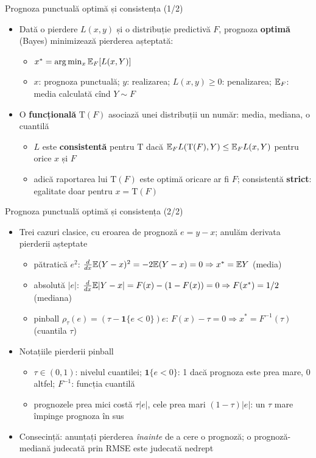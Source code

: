 \begin{frame}{Prognoza punctuală optimă și consistența (1/2)}
\itemsize{\small}
\begin{itemize}
    \item Dată o pierdere $L(x, y)$ și o distribuție predictivă $F$, prognoza \textbf{optimă} (Bayes) minimizează pierderea așteptată:
    \begin{itemize}
        \item $x^* = \arg\min_x \mathbb{E}_F[L(x, Y)]$
        \item $x$: prognoza punctuală; $y$: realizarea; $L(x, y) \ge 0$: penalizarea; $\mathbb{E}_F$: media calculată cînd $Y \sim F$
    \end{itemize}
    \item O \textbf{funcțională} $\mathrm{T}(F)$ asociază unei distribuții un număr: media, mediana, o cuantilă
    \begin{itemize}
        \item $L$ este \textbf{consistentă} pentru $\mathrm{T}$ dacă $\mathbb{E}_F L(\mathrm{T}(F), Y) \le \mathbb{E}_F L(x, Y)$ pentru orice $x$ și $F$ 
        \item adică raportarea lui $\mathrm{T}(F)$ este optimă oricare ar fi $F$; consistentă \textbf{strict}: egalitate doar pentru $x = \mathrm{T}(F)$
    \end{itemize}
\end{itemize}
\end{frame}

\begin{frame}{Prognoza punctuală optimă și consistența (2/2)}
\itemsize{\small}
\begin{itemize}
    \item Trei cazuri clasice, cu eroarea de prognoză $e = y - x$; anulăm derivata pierderii așteptate
    \begin{itemize}
        \item pătratică $e^2$: $\frac{d}{dx}\mathbb{E}(Y - x)^2 = -2\mathbb{E}(Y - x) = 0 \Rightarrow x^* = \mathbb{E} Y$ (media)
        \item absolută $|e|$: $\frac{d}{dx}\mathbb{E}|Y - x| = F(x) - (1 - F(x)) = 0 \Rightarrow F(x^*) = 1/2$ (mediana)
        \item pinball $\rho_\tau(e) = (\tau - \mathbf 1\{e < 0\})e$: $F(x) - \tau = 0 \Rightarrow x^* = F^{-1}(\tau)$ (cuantila $\tau$)
    \end{itemize}
    \item Notațiile pierderii pinball
    \begin{itemize}
        \item $\tau \in (0, 1)$: nivelul cuantilei; $\mathbf 1\{e < 0\}$: 1 dacă prognoza este prea mare, 0 altfel; $F^{-1}$: funcția cuantilă
        \item prognozele prea mici costă $\tau|e|$, cele prea mari $(1 - \tau)|e|$: un $\tau$ mare împinge prognoza în sus
    \end{itemize}
    \item Consecință: anunțați pierderea \emph{înainte} de a cere o prognoză; o prognoză-mediană judecată prin RMSE este judecată nedrept 
\end{itemize}
\end{frame}

